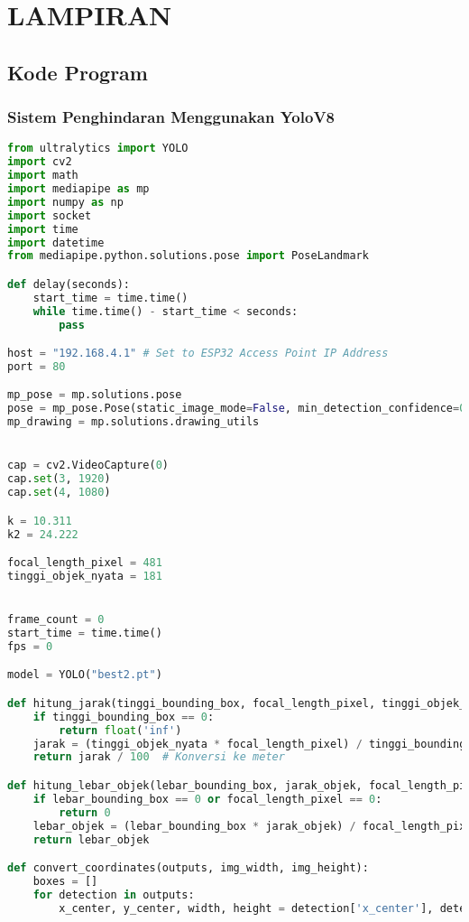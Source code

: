 \chapter*{LAMPIRAN}

\section*{Kode Program}
\subsection*{Sistem Penghindaran Menggunakan YoloV8}
\begin{lstlisting}[language=Python]
from ultralytics import YOLO
import cv2
import math
import mediapipe as mp
import numpy as np
import socket
import time
import datetime
from mediapipe.python.solutions.pose import PoseLandmark

def delay(seconds):
    start_time = time.time()
    while time.time() - start_time < seconds:
        pass

host = "192.168.4.1" # Set to ESP32 Access Point IP Address
port = 80

mp_pose = mp.solutions.pose
pose = mp_pose.Pose(static_image_mode=False, min_detection_confidence=0.6)
mp_drawing = mp.solutions.drawing_utils


cap = cv2.VideoCapture(0)
cap.set(3, 1920)  
cap.set(4, 1080)  

k = 10.311 
k2 = 24.222

focal_length_pixel = 481  
tinggi_objek_nyata = 181  


frame_count = 0
start_time = time.time()
fps = 0

model = YOLO("best2.pt")

def hitung_jarak(tinggi_bounding_box, focal_length_pixel, tinggi_objek_nyata):
    if tinggi_bounding_box == 0:
        return float('inf') 
    jarak = (tinggi_objek_nyata * focal_length_pixel) / tinggi_bounding_box
    return jarak / 100  # Konversi ke meter

def hitung_lebar_objek(lebar_bounding_box, jarak_objek, focal_length_pixel):
    if lebar_bounding_box == 0 or focal_length_pixel == 0:
        return 0 
    lebar_objek = (lebar_bounding_box * jarak_objek) / focal_length_pixel
    return lebar_objek

def convert_coordinates(outputs, img_width, img_height):
    boxes = []
    for detection in outputs:
        x_center, y_center, width, height = detection['x_center'], detection['y_center'], detection['width'], detection['height']
        

\end{lstlisting}
